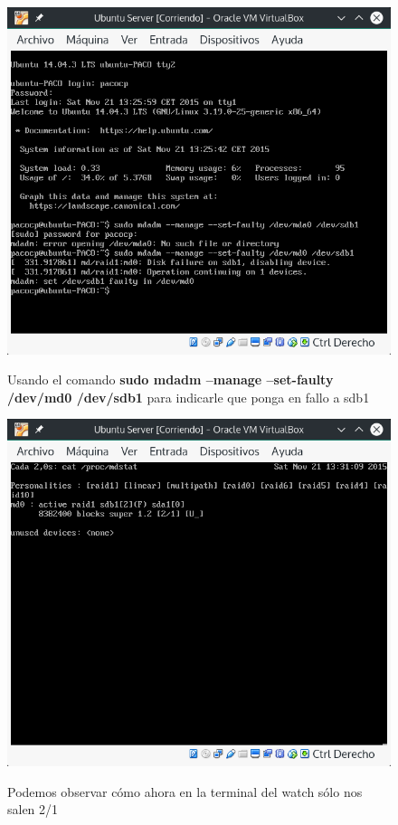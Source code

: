 \begin{figure}[H] %
	\centering
	\includegraphics[scale=0.5]{figuras/figura33.png}  %
	\label{figura33}
	
	\caption{Usando el comando \textbf{sudo mdadm --manage --set-faulty /dev/md0 /dev/sdb1} para indicarle que ponga en fallo a sdb1} 
\end{figure}


\begin{figure}[H] %
	\centering
	\includegraphics[scale=0.5]{figuras/figura34.png}  %
	\label{figura34}
	
	\caption{Podemos observar cómo ahora en la terminal del watch sólo nos salen 2/1} 
\end{figure}

